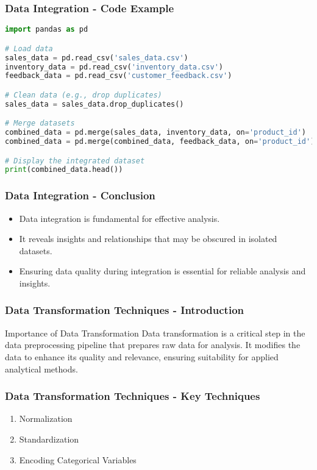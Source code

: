 \documentclass[aspectratio=169]{beamer}
\begin{document}
\begin{frame}[fragile]
    \frametitle{Data Integration - Code Example}
    \begin{lstlisting}[language=Python]
import pandas as pd

# Load data
sales_data = pd.read_csv('sales_data.csv')
inventory_data = pd.read_csv('inventory_data.csv')
feedback_data = pd.read_csv('customer_feedback.csv')

# Clean data (e.g., drop duplicates)
sales_data = sales_data.drop_duplicates()

# Merge datasets
combined_data = pd.merge(sales_data, inventory_data, on='product_id')
combined_data = pd.merge(combined_data, feedback_data, on='product_id')

# Display the integrated dataset
print(combined_data.head())
    \end{lstlisting}
\end{frame}

\begin{frame}[fragile]
    \frametitle{Data Integration - Conclusion}
    \begin{itemize}
        \item Data integration is fundamental for effective analysis.
        \item It reveals insights and relationships that may be obscured in isolated datasets.
        \item Ensuring data quality during integration is essential for reliable analysis and insights.
    \end{itemize}
\end{frame}

\begin{frame}[fragile]
    \frametitle{Data Transformation Techniques - Introduction}
    \begin{block}{Importance of Data Transformation}
        Data transformation is a critical step in the data preprocessing pipeline that prepares raw data for analysis. It modifies the data to enhance its quality and relevance, ensuring suitability for applied analytical methods.
    \end{block}
\end{frame}

\begin{frame}[fragile]
    \frametitle{Data Transformation Techniques - Key Techniques}
    \begin{enumerate}
        \item Normalization
        \item Standardization
        \item Encoding Categorical Variables
    \end{enumerate}
\end{frame}
\end{document}

